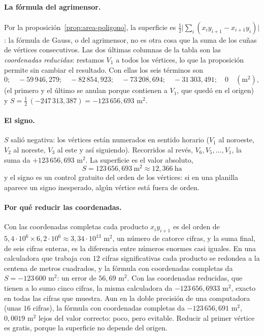 \paragraph{La fórmula del agrimensor.} Por la proposición~\ref{prop:area-poligono}, la
superficie es \(\tfrac12\bigl|\sum_i(x_iy_{i+1}-x_{i+1}y_i)\bigr|\): la fórmula de Gauss, o
del agrimensor, no es otra cosa que la suma de los cuñas de vértices consecutivos. Las dos
últimas columnas de la tabla son las \emph{coordenadas reducidas}: restamos \(V_1\) a todos
los vértices, lo que la proposición permite sin cambiar el resultado. Con ellas los seis
términos son
\[
  0;\quad -59\,946{,}279;\quad -82\,854{,}923;\quad -73\,208{,}694;\quad -31\,303{,}491;\quad 0
  \quad(\text{m}^2),
\]
(el primero y el último se anulan porque contienen a \(V_1\), que quedó en el origen) y
\(S=\tfrac12\,(-247\,313{,}387)=-123\,656{,}693\) m\(^2\).

\paragraph{El signo.} \(S\) salió negativa: los vértices están numerados en sentido horario
(\(V_1\) al noroeste, \(V_2\) al noreste, \(V_3\) al este y así siguiendo). Recorridos al
revés, \(V_6,V_5,\dots,V_1\), la suma da \(+123\,656{,}693\) m\(^2\). La superficie es el
valor absoluto,
\[
  \boxed{\ S=123\,656{,}693\ \text{m}^2\approx12{,}366\ \text{ha}\ }
\]
y el signo es un control gratuito del orden de los vértices: si en una planilla aparece un
signo inesperado, algún vértice está fuera de orden.

\paragraph{Por qué reducir las coordenadas.} Con las coordenadas completas cada producto
\(x_iy_{i+1}\) es del orden de \(5{,}4\cdot10^6\times6{,}2\cdot10^6\approx3{,}34\cdot10^{13}\)
m\(^2\), un número de catorce cifras, y la suma final, de seis cifras enteras, es la
diferencia entre números enormes casi iguales. En una calculadora que trabaja con \(12\)
cifras significativas cada producto se redondea a la centena de metros cuadrados, y la fórmula
con coordenadas completas da \(S=-123\,600\) m\(^2\): un error de \(56{,}69\) m\(^2\). Con
las coordenadas reducidas, que tienen a lo sumo cinco cifras, la misma calculadora da
\(-123\,656{,}6933\) m\(^2\), exacto en todas las cifras que muestra. Aun en la doble
precisión de una computadora (unas \(16\) cifras), la fórmula con coordenadas completas da
\(-123\,656{,}691\) m\(^2\), \(0{,}0019\) m\(^2\) lejos del valor correcto: poco, pero
evitable. Reducir al primer vértice es gratis, porque la superficie no depende del origen.


